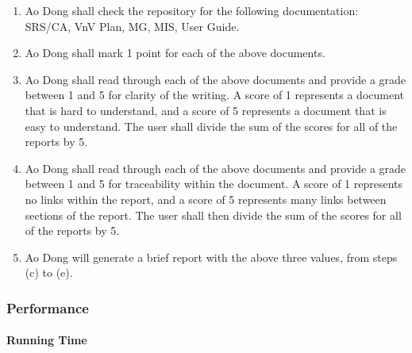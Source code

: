 \documentclass[12pt, titlepage]{article}
\begin{document}
\begin{enumerate}
\begin{enumerate}
\item Ao Dong shall check the repository for the following documentation:
SRS/CA, VnV Plan, MG, MIS, User Guide.
\item Ao Dong shall mark 1 point for each of the above documents.
\item Ao Dong shall read through each of the above documents and provide a grade
between 1 and 5 for clarity of the writing. A score of 1 represents a document
that is hard to understand, and a score of 5 represents a document that is easy
to understand. The user shall divide the sum of the scores for all of the
reports by 5.
\item Ao Dong shall read through each of the above documents and provide a grade
between 1 and 5 for traceability within the document. A score of 1 represents no
links within the report, and a score of 5 represents many links between sections
of the report. The user shall then divide the sum of the scores for all of the
reports by 5.
\item Ao Dong will generate a brief report with the above three values, from
steps (c) to (e).\\
\end{enumerate}

\end{enumerate}


\subsubsection{Performance}
		
\paragraph{Running Time}
\end{document}
